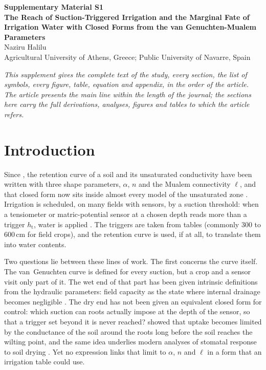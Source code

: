 \documentclass[preprint,12pt,authoryear]{elsarticle}
\newcommand{\htr}{h_{\mathrm{t}}}
\begin{document}
\renewcommand{\thesection}{S\arabic{section}}\renewcommand{\thefigure}{S\arabic{figure}}\renewcommand{\thetable}{S\arabic{table}}\renewcommand{\theequation}{S\arabic{equation}}
\begin{center}{\Large\bfseries Supplementary Material S1}\\[6pt]{\large\bfseries The Reach of Suction-Triggered Irrigation and the Marginal Fate of Irrigation Water with Closed Forms from the van Genuchten-Mualem Parameters}\\[8pt]Naziru Halilu\\[2pt]{\small Agricultural University of Athens, Greece; Public University of Navarre, Spain}\end{center}
\noindent\textit{This supplement gives the complete text of the study, every section, the list of symbols, every figure, table, equation and appendix, in the order of the article. The article presents the main line within the length of the journal; the sections here carry the full derivations, analyses, figures and tables to which the article refers.}
\bigskip
\section{Introduction}
Since \citet{vanGenuchten1980}, the retention curve of a soil and its unsaturated conductivity have been written with three shape parameters, $\alpha$, $n$ and the Mualem connectivity $\ell$, and that closed form now sits inside almost every model of the unsaturated zone \citep{vanGenuchten1985,Nielsen1986,Schaap2001,Simunek2016}. Irrigation is scheduled, on many fields with sensors, by a suction threshold: when a tensiometer or matric-potential sensor at a chosen depth reads more than a trigger $\htr$, water is applied \citep{Allen1998}. The triggers are taken from tables (commonly 300 to 600\,cm for field crops), and the retention curve is used, if at all, to translate them into water contents.

Two questions lie between these lines of work. The first concerns the curve itself. The van~Genuchten curve is defined for every suction, but a crop and a sensor visit only part of it. The wet end of that part has been given intrinsic definitions from the hydraulic parameters: field capacity as the state where internal drainage becomes negligible \citep{Twarakavi2009,Assouline2014}. The dry end has not been given an equivalent closed form for control: which suction can roots actually impose at the depth of the sensor, so that a trigger set beyond it is never reached? \citet{Gardner1960} showed that uptake becomes limited by the conductance of the soil around the roots long before the soil reaches the wilting point, and the same idea underlies modern analyses of stomatal response to soil drying \citep{Carminati2020}. Yet no expression links that limit to $\alpha$, $n$ and $\ell$ in a form that an irrigation table could use.
\end{document}
